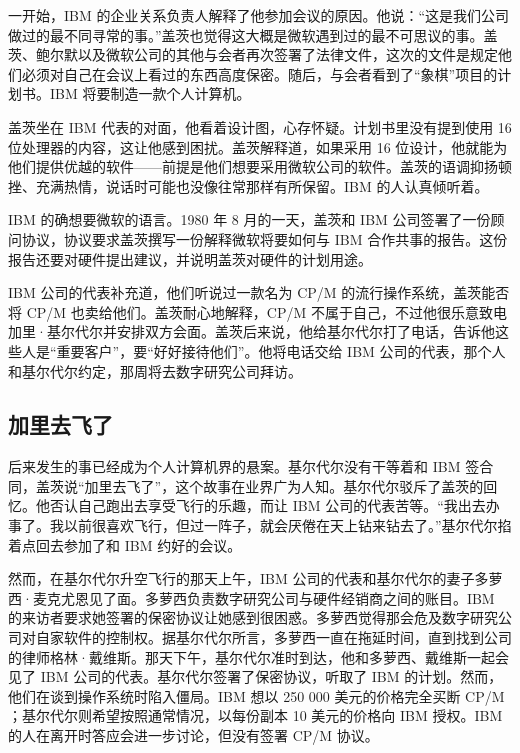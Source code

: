 \documentclass[12pt,UTF8]{ctexbook}
\begin{document}
一开始，IBM 的企业关系负责人解释了他参加会议的原因。他说：“这是我们公司做过的最不同寻常的事。”盖茨也觉得这大概是微软遇到过的最不可思议的事。盖茨、鲍尔默以及微软公司的其他与会者再次签署了法律文件，这次的文件是规定他们必须对自己在会议上看过的东西高度保密。随后，与会者看到了“象棋”项目的计划书。IBM 将要制造一款个人计算机。

盖茨坐在 IBM 代表的对面，他看着设计图，心存怀疑。计划书里没有提到使用 16 位处理器的内容，这让他感到困扰。盖茨解释道，如果采用 16 位设计，他就能为他们提供优越的软件——前提是他们想要采用微软公司的软件。盖茨的语调抑扬顿挫、充满热情，说话时可能也没像往常那样有所保留。IBM 的人认真倾听着。

IBM 的确想要微软的语言。1980 年 8 月的一天，盖茨和 IBM 公司签署了一份顾问协议，协议要求盖茨撰写一份解释微软将要如何与 IBM 合作共事的报告。这份报告还要对硬件提出建议，并说明盖茨对硬件的计划用途。

IBM 公司的代表补充道，他们听说过一款名为 CP/M 的流行操作系统，盖茨能否将 CP/M 也卖给他们。盖茨耐心地解释，CP/M 不属于自己，不过他很乐意致电加里·基尔代尔并安排双方会面。盖茨后来说，他给基尔代尔打了电话，告诉他这些人是“重要客户”，要“好好接待他们”。他将电话交给 IBM 公司的代表，那个人和基尔代尔约定，那周将去数字研究公司拜访。





\subsection{加里去飞了}


后来发生的事已经成为个人计算机界的悬案。基尔代尔没有干等着和 IBM 签合同，盖茨说“加里去飞了”，这个故事在业界广为人知。基尔代尔驳斥了盖茨的回忆。他否认自己跑出去享受飞行的乐趣，而让 IBM 公司的代表苦等。“我出去办事了。我以前很喜欢飞行，但过一阵子，就会厌倦在天上钻来钻去了。”基尔代尔掐着点回去参加了和 IBM 约好的会议。

然而，在基尔代尔升空飞行的那天上午，IBM 公司的代表和基尔代尔的妻子多萝西·麦克尤恩见了面。多萝西负责数字研究公司与硬件经销商之间的账目。IBM 的来访者要求她签署的保密协议让她感到很困惑。多萝西觉得那会危及数字研究公司对自家软件的控制权。据基尔代尔所言，多萝西一直在拖延时间，直到找到公司的律师格林·戴维斯。那天下午，基尔代尔准时到达，他和多萝西、戴维斯一起会见了 IBM 公司的代表。基尔代尔签署了保密协议，听取了 IBM 的计划。然而，他们在谈到操作系统时陷入僵局。IBM 想以 250 000 美元的价格完全买断 CP/M ；基尔代尔则希望按照通常情况，以每份副本 10 美元的价格向 IBM 授权。IBM 的人在离开时答应会进一步讨论，但没有签署 CP/M 协议。
\end{document}
